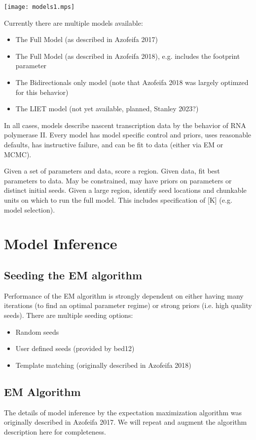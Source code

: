\documentclass[11pt]{article}
\begin{document}
\texttt{[image: models1.mps]}

Currently there are multiple models available:

\begin{itemize}
\item The Full Model (as described in Azofeifa 2017)
\item The Full Model (as described in Azofeifa 2018), e.g. includes
the footprint parameter
\item The Bidirectionals only model (note that Azofeifa 2018 was largely
    optimzed for this behavior)
\item The LIET model (not yet available, planned, Stanley 2023?)
\end{itemize}

In all cases, models describe nascent transcription data by 
the behavior of RNA polymerase II.   Every model has model specific control
and priors, uses reasonable defaults, has instructive failure, and can 
be fit to data (either via EM or MCMC).

Given a set of parameters and data, score a region.
Given data, fit best parameters to data.  May be constrained, may have 
priors on parameters or distinct initial seeds.
Given a large region, identify seed locations and chunkable units on which to
run the full model.   This includes specification of [K] (e.g. model selection).

\section{Model Inference}

\subsection{Seeding the EM algorithm}
\label{seeds}
Performance of the EM algorithm is strongly dependent on either having 
many iterations (to find an optimal parameter regime) or strong priors
(i.e. high quality seeds).  There are multiple seeding options:

\begin{itemize}
\item Random seeds
\item User defined seeds (provided by bed12)
\item Template matching (originally described in Azofeifa 2018)
\end{itemize}

\subsection{EM Algorithm}
The details of model inference by the expectation maximization algorithm was
originally described in Azofeifa 2017.  We will repeat and augment the 
algorithm description here for completeness.
\end{document}
